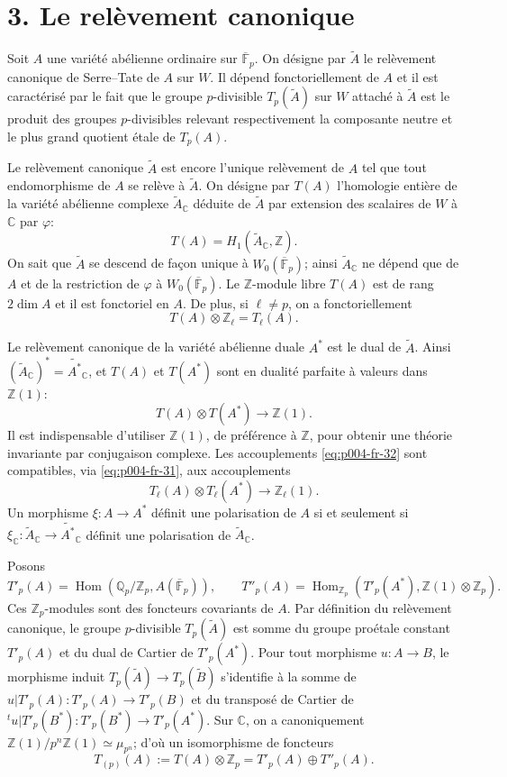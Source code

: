 \documentclass[12pt]{article}
\DeclareMathOperator{\Hom}{Hom}
\newcommand{\Z}{\mathbb{Z}}
\newcommand{\Q}{\mathbb{Q}}
\newcommand{\C}{\mathbb{C}}
\newcommand{\F}{\mathbb{F}}
\theoremstyle{plain}
\theoremstyle{definition}
\theoremstyle{remark}
\begin{document}
\section*{3. Le relèvement canonique}
Soit $A$ une variété abélienne ordinaire sur $\overline{\F}_p$. On désigne par $\widetilde A$ le relèvement canonique de Serre--Tate de $A$ sur $W$. Il dépend fonctoriellement de $A$ et il est caractérisé par le fait que le groupe $p$-divisible $T_p(\widetilde A)$ sur $W$ attaché à $\widetilde A$ est le produit des groupes $p$-divisibles relevant respectivement la composante neutre et le plus grand quotient étale de $T_p(A)$.

Le relèvement canonique $\widetilde A$ est encore l'unique relèvement de $A$ tel que tout endomorphisme de $A$ se relève à $\widetilde A$. On désigne par $T(A)$ l'homologie entière de la variété abélienne complexe $\widetilde A_\C$ déduite de $\widetilde A$ par extension des scalaires de $W$ à $\C$ par $\varphi$:
\[
 T(A)=H_1(\widetilde A_\C,\Z).
\]
On sait que $\widetilde A$ se descend de façon unique à $W_0(\overline{\F}_p)$; ainsi $\widetilde A_\C$ ne dépend que de $A$ et de la restriction de $\varphi$ à $W_0(\overline{\F}_p)$. Le $\Z$-module libre $T(A)$ est de rang $2\dim A$ et il est fonctoriel en $A$. De plus, si $\ell\ne p$, on a fonctoriellement
\begin{equation}\label{eq:p004-fr-31}
 T(A)\otimes\Z_\ell=T_\ell(A).
\end{equation}

Le relèvement canonique de la variété abélienne duale $A^*$ est le dual de $\widetilde A$. Ainsi $(\widetilde A_\C)^*=\widetilde{A^*}_\C$, et $T(A)$ et $T(A^*)$ sont en dualité parfaite à valeurs dans $\Z(1)$:
\begin{equation}\label{eq:p004-fr-32}
 T(A)\otimes T(A^*)\longrightarrow \Z(1).
\end{equation}
Il est indispensable d'utiliser $\Z(1)$, de préférence à $\Z$, pour obtenir une théorie invariante par conjugaison complexe. Les accouplements \eqref{eq:p004-fr-32} sont compatibles, via \eqref{eq:p004-fr-31}, aux accouplements
\[
 T_\ell(A)\otimes T_\ell(A^*)\longrightarrow\Z_\ell(1).
\]
Un morphisme $\xi:A\to A^*$ définit une polarisation de $A$ si et seulement si $\xi_\C:\widetilde A_\C\to\widetilde{A^*}_\C$ définit une polarisation de $\widetilde A_\C$.

Posons
\[
 T'_p(A)=\Hom(\Q_p/\Z_p,A(\overline{\F}_p)),
\qquad
 T''_p(A)=\Hom_{\Z_p}(T'_p(A^*),\Z(1)\otimes\Z_p).
\]
Ces $\Z_p$-modules sont des foncteurs covariants de $A$. Par définition du relèvement canonique, le groupe $p$-divisible $T_p(\widetilde A)$ est somme du groupe proétale constant $T'_p(A)$ et du dual de Cartier de $T'_p(A^*)$. Pour tout morphisme $u:A\to B$, le morphisme induit $T_p(\widetilde A)\to T_p(\widetilde B)$ s'identifie à la somme de $u|T'_p(A):T'_p(A)\to T'_p(B)$ et du transposé de Cartier de ${}^t u|T'_p(B^*):T'_p(B^*)\to T'_p(A^*)$. Sur $\C$, on a canoniquement $\Z(1)/p^n\Z(1)\simeq\mu_{p^n}$; d'où un isomorphisme de foncteurs
\begin{equation}\label{eq:p004-fr-pdec}
 T_{(p)}(A):=T(A)\otimes\Z_p=T'_p(A)\oplus T''_p(A).
\end{equation}
\end{document}
